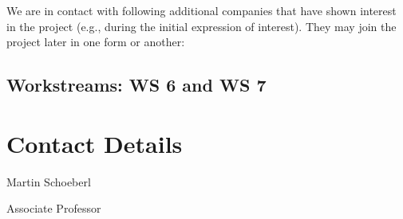 \documentclass[fleqn,12pt]{article}
\begin{document}
We are in contact with following additional companies that have shown interest in
the project (e.g., during the initial expression of interest).
They may join the project later in one form or another:

%
%
%
%


%


\subsection*{Workstreams: WS 6 and WS 7}


\section*{Contact Details}

Martin Schoeberl

\noindent Associate Professor
\end{document}
